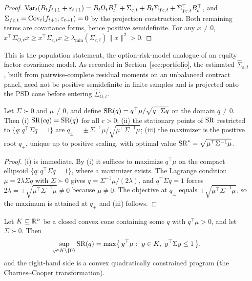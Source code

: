 \begin{proof}
\(\operatorname{Var}_t(B_tf_{t+1}+\varepsilon_{t+1})
=B_t\Omega_tB_t^\top+\Sigma_{\varepsilon,t}
+B_t\Sigma_{f\varepsilon,t}+\Sigma_{f\varepsilon,t}^\top B_t^\top\), and
\(\Sigma_{f\varepsilon,t}=\operatorname{Cov}_t(f_{t+1},\varepsilon_{t+1})=0\) by the projection
construction. Both remaining terms are covariance forms, hence positive semidefinite. For
any \(x\neq0\),
\(x^\top\Sigma_{O,t}x\ge x^\top\Sigma_{\varepsilon,t}x
\ge\lambda_{\min}(\Sigma_{\varepsilon,t})\|x\|^2>0\).
\end{proof}

This is the population statement, the option-risk-model analogue of an equity factor
covariance model. As recorded in Section~\ref{sec:portfolio}, the estimated
\(\widehat\Sigma_{\varepsilon,t}\), built from pairwise-complete residual moments on an
unbalanced contract panel, need not be positive semidefinite in finite samples and is
projected onto the PSD cone before entering \(\widehat\Sigma_{O,t}\).

\begin{proposition}\label{prop:maxsharpe}
Let \(\Sigma\succ0\) and \(\mu\neq0\), and define
\(\operatorname{SR}(q)=q^\top\mu/\sqrt{q^\top\Sigma q}\) on the domain \(q\neq0\). Then
(i) \(\operatorname{SR}(cq)=\operatorname{SR}(q)\) for all \(c>0\);
(ii) the stationary points of \(\operatorname{SR}\) restricted to \(\{q:q^\top\Sigma q=1\}\) are
\(q_\pm=\pm\,\Sigma^{-1}\mu/\sqrt{\mu^\top\Sigma^{-1}\mu}\);
(iii) the maximizer is the positive root \(q_+\), unique up to positive scaling, with
optimal value \(\operatorname{SR}^{\ast}=\sqrt{\mu^\top\Sigma^{-1}\mu}\).
\end{proposition}

\begin{proof}
(i) is immediate. By (i) it suffices to maximize \(q^\top\mu\) on the compact ellipsoid
\(\{q:q^\top\Sigma q=1\}\), where a maximizer exists. The Lagrange condition
\(\mu=2\lambda\Sigma q\) with \(\Sigma\succ0\) gives \(q=\Sigma^{-1}\mu/(2\lambda)\), and
\(q^\top\Sigma q=1\) forces \(2\lambda=\pm\sqrt{\mu^\top\Sigma^{-1}\mu}\neq0\) because
\(\mu\neq0\). The objective at \(q_\pm\) equals \(\pm\sqrt{\mu^\top\Sigma^{-1}\mu}\), so the
maximum is attained at \(q_+\) and (iii) follows.
\end{proof}

\begin{proposition}\label{prop:conic}
Let \(K\subseteq\mathbb{R}^n\) be a closed convex cone containing some \(q\) with
\(q^\top\mu>0\), and let \(\Sigma\succ0\). Then
\[
  \sup_{q\in K\setminus\{0\}}\operatorname{SR}(q)
  =\max\bigl\{\,y^\top\mu:\ y\in K,\ y^\top\Sigma y\le1\,\bigr\},
\]
and the right-hand side is a convex quadratically constrained program (the
Charnes--Cooper transformation).
\end{proposition}

